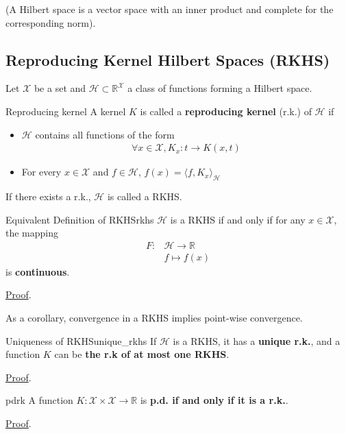 \documentclass{article}
\begin{document}
(A Hilbert space is a vector space with an inner product and complete for the 
corresponding norm).

\subsection{Reproducing Kernel Hilbert Spaces (RKHS)}

Let $\mathcal{X}$ be a set and $\mathcal{H} \subset \mathbb{R}^\mathcal{X}$ a 
class of functions forming a Hilbert space. 
\begin{Definition}{Reproducing kernel}{}
    A kernel $K$ is called a \textbf{reproducing kernel} (r.k.) of $\mathcal{H}$ 
    if 
    \begin{itemize}
        \item $\mathcal{H}$ contains all functions of the form 
        \begin{align*}
           \boxed{\forall x \in \mathcal{X}, K_x: t \rightarrow K(x, t)}
        \end{align*}
        \item For every $x \in \mathcal{X}$ and $f\in \mathcal{H}$, 
        $\boxed{f(x) = \langle f, K_x \rangle_\mathcal{H} }$
    \end{itemize}
\end{Definition}

If there exists a r.k., $\mathcal{H}$ is called a RKHS.

\begin{Theorem}{Equivalent Definition of RKHS}{rkhs}
    $\mathcal{H}$ is a RKHS if and only if for any $x\in\mathcal{X}$, the 
    mapping
    \begin{align*}
        F: & \mathcal{H}\rightarrow \mathbb{R}\\
        & f \mapsto f(x)
    \end{align*}
    is \textbf{continuous}.
\end{Theorem}
\hyperref[prf:rkhs]{\small Proof}.

As a corollary, convergence in a RKHS implies point-wise convergence.


\begin{Theorem}{Uniqueness of RKHS}{unique_rkhs}
  If $\mathcal{H}$ is a RKHS, it has a \textbf{unique r.k.}, and a function $K$
  can be \textbf{the r.k of at most one RKHS}.
\end{Theorem}
\hyperref[prf:unique_rkhs]{\small Proof}.


\begin{Theorem}{}{pdrk}
  A function $K : \mathcal{X} \times \mathcal{X} \rightarrow \mathbb{R}$ is 
  \textbf{p.d. if and only if it is a r.k.}.
\end{Theorem}
\hyperref[prf:pdrk]{\small Proof}.
\end{document}
